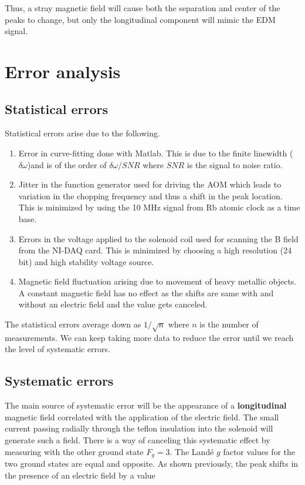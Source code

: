 Thus, a stray magnetic field will cause both the separation and center of the peaks to change, but only the longitudinal component will mimic the EDM signal.

\section{Error analysis}

\subsection{Statistical errors}
Statistical errors arise due to the following.
\begin{enumerate}
	\item Error in curve-fitting done with Matlab. This is due to the finite linewidth ($\delta \omega$)and is of the order of $\delta \omega/SNR$ where $SNR$ is the signal to noise ratio.
	
	\item Jitter in the function generator used for driving the AOM which leads to variation in the chopping frequency and thus a shift in the peak location. This is minimized by using the 10 MHz signal from Rb atomic clock as a time base.
	
	\item Errors in the voltage applied to the solenoid coil used for scanning the B field from the NI-DAQ card. This is minimized by choosing a high resolution (24 bit) and high stability voltage source.
	
	\item Magnetic field fluctuation arising due to movement of heavy metallic objects. A constant magnetic field has no effect as the shifts are same with and without an electric field and the value gets canceled. 
	
\end{enumerate}

The statistical errors average down as $1/\sqrt{n}$ where $n$ is the number of measurements. We can keep taking more data to reduce the error until we reach the level of systematic errors.

\subsection{Systematic errors}
The main source of systematic error will be the appearance of a \textbf{longitudinal} magnetic field correlated with  the application of the electric field. The small current passing radially through the teflon insulation into the solenoid will generate such a field. There is a way of canceling this systematic effect by measuring with the other ground state $F_g=3$. The Land\'e $g$ factor values for the two ground states are equal and opposite. As shown previously, the peak shifts in the presence of an electric field by a value

